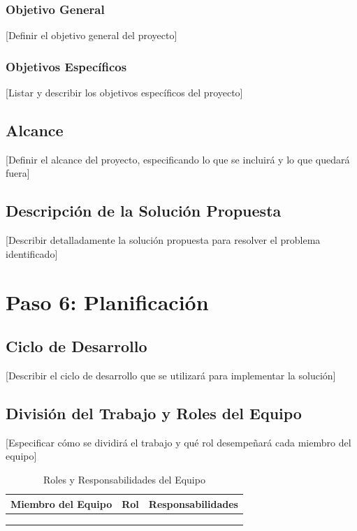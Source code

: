 \documentclass[12pt,letterpaper]{report}
\begin{document}
\subsubsection{Objetivo General}
[Definir el objetivo general del proyecto]

\subsubsection{Objetivos Específicos}
[Listar y describir los objetivos específicos del proyecto]

\subsection{Alcance}
[Definir el alcance del proyecto, especificando lo que se incluirá y lo que quedará fuera]

\subsection{Descripción de la Solución Propuesta}
[Describir detalladamente la solución propuesta para resolver el problema identificado]

\section{Paso 6: Planificación}

\subsection{Ciclo de Desarrollo}
[Describir el ciclo de desarrollo que se utilizará para implementar la solución]

\subsection{División del Trabajo y Roles del Equipo}
[Especificar cómo se dividirá el trabajo y qué rol desempeñará cada miembro del equipo]

\begin{table}[H]
    \centering
    \begin{tabularx}{\textwidth}{|X|X|X|}
        \hline
        \textbf{Miembro del Equipo} & \textbf{Rol} & \textbf{Responsabilidades} \\
        \hline
        & & \\
        \hline
        & & \\
        \hline
        & & \\
        \hline
    \end{tabularx}
    \caption{Roles y Responsabilidades del Equipo}
\end{table}
\end{document}

